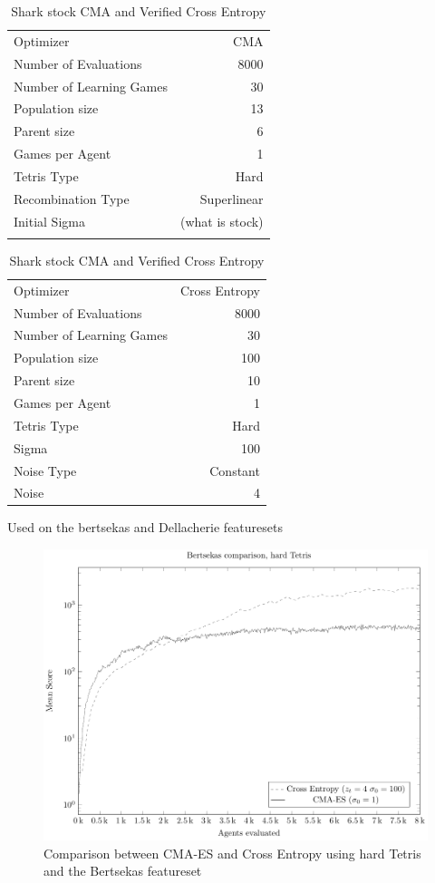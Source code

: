 \begin{table}[h]
\centering
\small
\caption{Shark stock CMA and Verified Cross Entropy}
\begin{tabular}{l r}
Optimizer & CMA\\
Number of Evaluations & 8000\\
Number of Learning Games & 30\\
Population size& 13\\
Parent size & 6\\
Games per Agent & 1\\
Tetris Type & Hard\\
\hline
Recombination Type & Superlinear\\
Initial Sigma & (what is stock)\\
\quad & \quad
\end{tabular}
\quad
\begin{tabular}{l r}
Optimizer & Cross Entropy\\
Number of Evaluations & 8000\\
Number of Learning Games & 30\\
Population size & 100\\
Parent size & 10\\
Games per Agent & 1\\
Tetris Type & Hard\\
\hline
Sigma & 100\\
Noise Type & Constant\\
Noise & 4
\end{tabular}
\end{table}

Used on the bertsekas and Dellacherie featuresets

\begin{figure}[H]
\includegraphics[scale=1]{plots/plotBertsekasCmaVsCEHardTetris}
\caption{Comparison between CMA-ES and Cross Entropy 
using hard Tetris and the Bertsekas featureset }
\end{figure}


